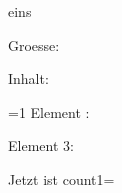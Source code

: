 \documentclass[a4paper]{article}
\author{Christian Feuersänger}
\begin{document}
{
% 
% 
% 
% 
% 
% 
% 
% 
% 
% 
% 
% 
% 
% 
% 
% 
% 
% 
% 
% 


%
\let\probe=\empty
\listpushback eins\to\probe
\listpushback [probe]\to\probe
\listpushback [probe2]\to\probe
\listpushback [probe3]\to\probe

Groesse: \listsize\probe{}\the{}

Inhalt:

\listforeach\probe\as\curlistelem{\curlistelem \par}

\listnew{}%
\listforeach\foolist\as{}%

%
=1
Element \the{}: \listselect{}\of\probe\to\elem\elem

Element 3: \of\probe\to\elem\elem

Jetzt ist count1=\the{}
\vskip1cm

}
\end{document}
